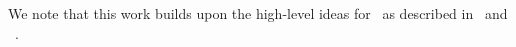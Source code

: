 We note that this work builds upon the high-level ideas for \SeeDB\ as 
described in~\cite{DBLP:conf/vldb/Parameswaran2013} and 
~\cite{DBLP:journals/pvldb/VartakMPP14}.


